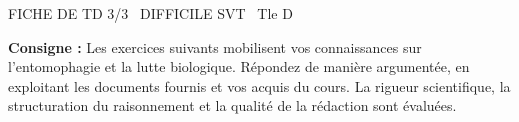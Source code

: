 \documentclass[11pt]{article}
\begin{document}
\begin{tcolorbox}[enhanced,colback=popink,colframe=popink,arc=10pt,boxrule=0pt,left=12pt,right=12pt,top=9pt,bottom=9pt]
{\color{white}\popxbold\small FICHE DE TD 3/3 \textbullet\ DIFFICILE \hfill SVT \textbullet\ Tle D\par}
\end{tcolorbox}
\vspace{4pt}
\noindent\textbf{Consigne :} Les exercices suivants mobilisent vos connaissances sur l'entomophagie et la lutte biologique. Répondez de manière argumentée, en exploitant les documents fournis et vos acquis du cours. La rigueur scientifique, la structuration du raisonnement et la qualité de la rédaction sont évaluées.
\end{document}
